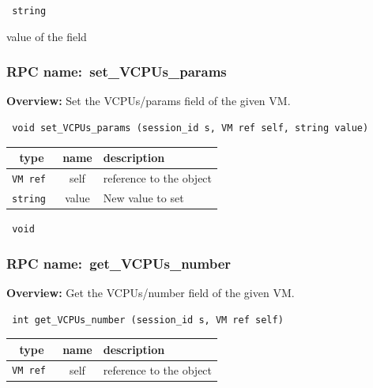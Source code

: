 {\tt 
string
}


value of the field
\vspace{0.3cm}
\vspace{0.3cm}
\vspace{0.3cm}
\subsubsection{RPC name:~set\_VCPUs\_params}

{\bf Overview:} 
Set the VCPUs/params field of the given VM.

\begin{verbatim} void set_VCPUs_params (session_id s, VM ref self, string value)\end{verbatim}



 
\vspace{0.3cm}
\begin{tabular}{|c|c|p{7cm}|}
 \hline
{\bf type} & {\bf name} & {\bf description} \\ \hline
{\tt VM ref } & self & reference to the object \\ \hline 

{\tt string } & value & New value to set \\ \hline 

\end{tabular}

\vspace{0.3cm}

{\tt 
void
}



\vspace{0.3cm}
\vspace{0.3cm}
\vspace{0.3cm}
\subsubsection{RPC name:~get\_VCPUs\_number}

{\bf Overview:} 
Get the VCPUs/number field of the given VM.

\begin{verbatim} int get_VCPUs_number (session_id s, VM ref self)\end{verbatim}



 
\vspace{0.3cm}
\begin{tabular}{|c|c|p{7cm}|}
 \hline
{\bf type} & {\bf name} & {\bf description} \\ \hline
{\tt VM ref } & self & reference to the object \\ \hline 

\end{tabular}

